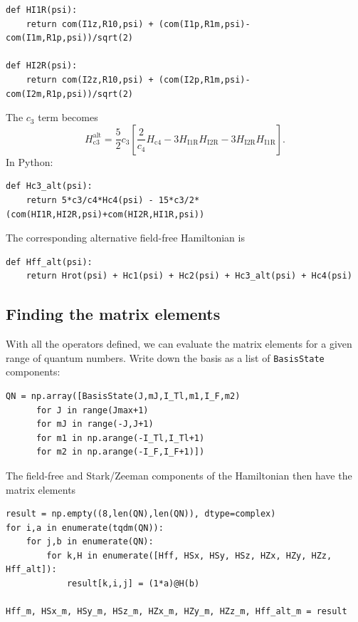 \begin{lstlisting}
def HI1R(psi):
    return com(I1z,R10,psi) + (com(I1p,R1m,psi)-com(I1m,R1p,psi))/sqrt(2)

def HI2R(psi):
    return com(I2z,R10,psi) + (com(I2p,R1m,psi)-com(I2m,R1p,psi))/sqrt(2)
\end{lstlisting}

The $c_3$ term becomes
%
$$
H_\text{c3}^\text{alt}=\frac{5}{2}c_3\left[
\frac{2}{c_4}H_\text{c4}-3H_\text{I1R}H_\text{I2R}-3H_\text{I2R}H_\text{I1R}
\right].
$$
%
In Python:

\begin{lstlisting}
def Hc3_alt(psi):
    return 5*c3/c4*Hc4(psi) - 15*c3/2*(com(HI1R,HI2R,psi)+com(HI2R,HI1R,psi))
\end{lstlisting}

The corresponding alternative field-free Hamiltonian is

\begin{lstlisting}
def Hff_alt(psi):
    return Hrot(psi) + Hc1(psi) + Hc2(psi) + Hc3_alt(psi) + Hc4(psi)
\end{lstlisting}

\subsection{Finding the matrix elements}

With all the operators defined, we can evaluate the matrix elements for a given
range of quantum numbers. Write down the basis as a list of \verb`BasisState`
components:

\begin{lstlisting}
QN = np.array([BasisState(J,mJ,I_Tl,m1,I_F,m2)
      for J in range(Jmax+1)
      for mJ in range(-J,J+1)
      for m1 in np.arange(-I_Tl,I_Tl+1)
      for m2 in np.arange(-I_F,I_F+1)])
\end{lstlisting}

The field-free and Stark/Zeeman components of the Hamiltonian then have the
matrix elements

\begin{lstlisting}
result = np.empty((8,len(QN),len(QN)), dtype=complex)
for i,a in enumerate(tqdm(QN)):
    for j,b in enumerate(QN):
        for k,H in enumerate([Hff, HSx, HSy, HSz, HZx, HZy, HZz, Hff_alt]):
            result[k,i,j] = (1*a)@H(b)

Hff_m, HSx_m, HSy_m, HSz_m, HZx_m, HZy_m, HZz_m, Hff_alt_m = result
\end{lstlisting}

